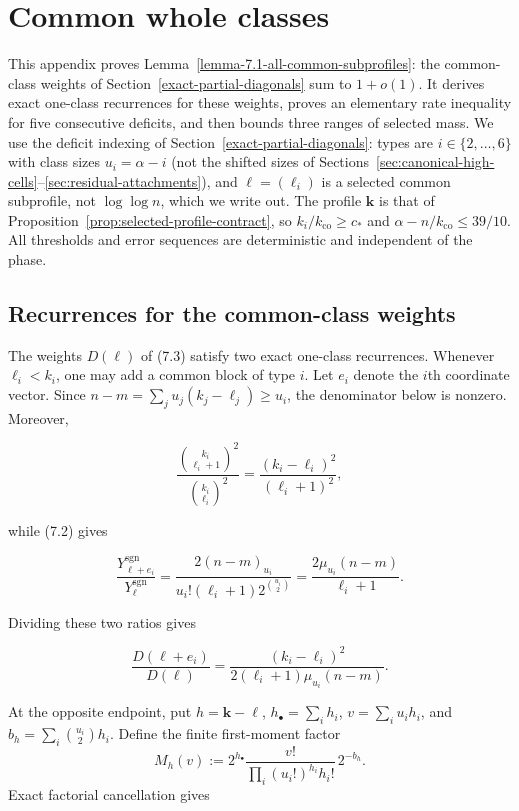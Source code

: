 \documentclass[a4paper,10pt,reqno]{amsart}
\numberwithin{equation}{section}
\theoremstyle{plain}
\theoremstyle{remark}
\begin{document}
\section{Common whole classes}
\label{app:common-classes}

This appendix proves Lemma~\ref{lemma-7.1-all-common-subprofiles}: the
common-class weights of Section~\ref{exact-partial-diagonals} sum to
$1+o(1)$. It derives exact one-class recurrences for these weights, proves
an elementary rate inequality for five consecutive deficits, and then bounds
three ranges of selected mass. We use the deficit indexing of
Section~\ref{exact-partial-diagonals}: types are $i\in\{2,\ldots,6\}$ with
class sizes $u_i=\alpha-i$ (not the shifted sizes of
Sections~\ref{sec:canonical-high-cells}--\ref{sec:residual-attachments}),
and $\ell=(\ell_i)$ is a selected common subprofile, not $\log\log n$, which
we write out. The profile $\mathbf k$ is that of
Proposition~\ref{prop:selected-profile-contract}, so
$k_i/k_{\mathrm{co}}\ge c_*$ and $\alpha-n/k_{\mathrm{co}}\le39/10$. All
thresholds and error sequences are deterministic and independent of the
phase.

\subsection{Recurrences for the common-class weights}
\label{app:common-recurrences}

The weights $D(\ell)$ of (7.3) satisfy two exact one-class recurrences.
Whenever $\ell_i<k_i$, one may add a common block of type $i$.  Let $e_i$
denote the $i$th coordinate vector.  Since
$n-m=\sum_j u_j(k_j-\ell_j)\ge u_i$, the denominator below is nonzero.
Moreover,

\[
 \frac{\binom{k_i}{\ell_i+1}^2}{\binom{k_i}{\ell_i}^2}
 =\frac{(k_i-\ell_i)^2}{(\ell_i+1)^2},
\]

while (7.2) gives

\[
 \frac{Y_{\ell+e_i}^{\mathrm{sgn}}}
      {Y_\ell^{\mathrm{sgn}}}
 =\frac{2(n-m)_{u_i}}
        {u_i!(\ell_i+1)2^{\binom{u_i}{2}}}
 =\frac{2\mu_{u_i}(n-m)}{\ell_i+1}.
\]

Dividing these two ratios gives

\begin{equation}
 \frac{D(\ell+e_i)}{D(\ell)}
 =\frac{(k_i-\ell_i)^2}
        {2(\ell_i+1)\mu_{u_i}(n-m)}.                     \label{eq:common-forward-recurrence}
\end{equation}

At the opposite endpoint, put $h=\mathbf k-\ell$,
$h_\bullet=\sum_i h_i$, $v=\sum_i u_i h_i$, and
$b_h=\sum_i\binom{u_i}{2}h_i$. Define the finite first-moment factor
\[
 M_h(v):=
 2^{h_\bullet}\frac{v!}{\prod_i(u_i!)^{h_i}h_i!}\,2^{-b_h}.
\]
Exact factorial cancellation gives
\end{document}
